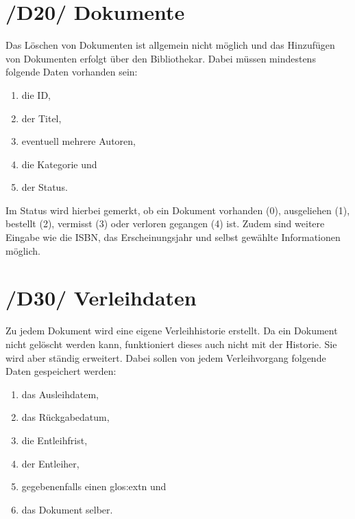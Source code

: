 \section{/D20/ Dokumente}
Das Löschen von Dokumenten ist allgemein nicht möglich und das Hinzufügen von Dokumenten erfolgt über den Bibliothekar. Dabei müssen mindestens folgende Daten vorhanden sein:
\begin{enumerate}
	\item die ID,
	\item der Titel,
	\item eventuell mehrere Autoren,
	\item die Kategorie und
	\item der Status.
\end{enumerate}
Im Status wird hierbei gemerkt, ob ein Dokument vorhanden (0), ausgeliehen (1), bestellt (2), vermisst (3) oder verloren gegangen (4) ist. 
Zudem sind weitere Eingabe wie die ISBN, das Erscheinungsjahr und selbst gewählte Informationen möglich. 

\section{/D30/ Verleihdaten}
Zu jedem Dokument wird eine eigene Verleihhistorie erstellt. Da ein Dokument nicht gelöscht werden kann, funktioniert dieses auch nicht mit der Historie. Sie wird aber ständig erweitert. Dabei sollen von jedem Verleihvorgang folgende Daten gespeichert werden:
\begin{enumerate}
	\item das Ausleihdatem,
	\item das Rückgabedatum,
	\item die Entleihfrist,
	\item der Entleiher,
	\item gegebenenfalls einen \gls{glos:ext}n und
	\item das Dokument selber.
\end{enumerate} 
